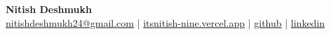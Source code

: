 \begin{center}
    \Huge \textbf{Nitish Deshmukh} \\[3pt]
    \normalsize
        \href{mailto:nitishdeshmukh24@gmail.com}{nitishdeshmukh24@gmail.com} |
        \href{https://itsnitish-nine.vercel.app}{itsnitish-nine.vercel.app} |
        \href{https://github.com/nitishdeshmukh}{github} |
        \href{https://www.linkedin.com/in/nitish-deshmukh/}{linkedin}
\end{center}
